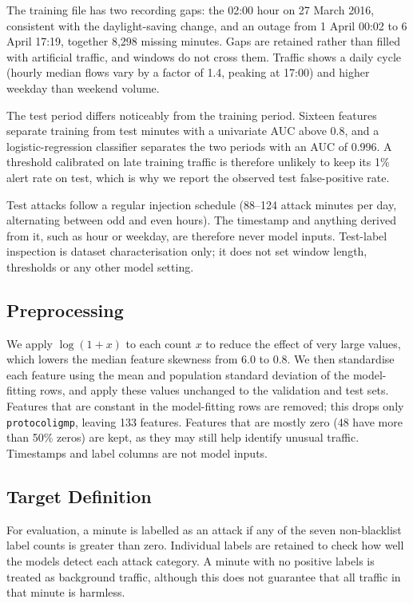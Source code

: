 \documentclass[conference]{IEEEtran}
\begin{document}
The training file has two recording gaps: the 02:00 hour on 27 March 2016, consistent with the daylight-saving change, and an outage from 1 April 00:02 to 6 April 17:19, together 8,298 missing minutes. Gaps are retained rather than filled with artificial traffic, and windows do not cross them. Traffic shows a daily cycle (hourly median flows vary by a factor of 1.4, peaking at 17:00) and higher weekday than weekend volume.

The test period differs noticeably from the training period. Sixteen features separate training from test minutes with a univariate AUC above 0.8, and a logistic-regression classifier separates the two periods with an AUC of 0.996. A threshold calibrated on late training traffic is therefore unlikely to keep its 1\% alert rate on test, which is why we report the observed test false-positive rate.

Test attacks follow a regular injection schedule (88--124 attack minutes per day, alternating between odd and even hours). The timestamp and anything derived from it, such as hour or weekday, are therefore never model inputs. Test-label inspection is dataset characterisation only; it does not set window length, thresholds or any other model setting.

\subsection{Preprocessing}
We apply $\log(1+x)$ to each count $x$ to reduce the effect of very large values, which lowers the median feature skewness from 6.0 to 0.8. We then standardise each feature using the mean and population standard deviation of the model-fitting rows, and apply these values unchanged to the validation and test sets. Features that are constant in the model-fitting rows are removed; this drops only \texttt{protocoligmp}, leaving 133 features. Features that are mostly zero (48 have more than 50\% zeros) are kept, as they may still help identify unusual traffic. Timestamps and label columns are not model inputs.

\subsection{Target Definition}
For evaluation, a minute is labelled as an attack if any of the seven non-blacklist label counts is greater than zero. Individual labels are retained to check how well the models detect each attack category. A minute with no positive labels is treated as background traffic, although this does not guarantee that all traffic in that minute is harmless.
\end{document}
